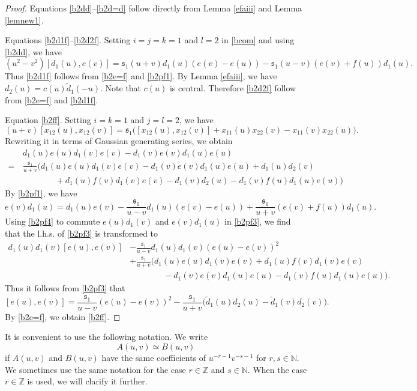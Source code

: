 \documentclass[11pt,reqno]{amsart}
\newcommand{\mybox}{%
    \collectbox{%
        \setlength{\fboxsep}{1pt}%
        \fbox{\BOXCONTENT}%
    }%
}
\numberwithin{equation}{section}
\theoremstyle{definition}
\theoremstyle{remark}
\newcommand{\beq}{\begin{equation}}
\newcommand{\eeq}{\end{equation}}
\newcommand{\bZ}{\mathbb{Z}}
\newcommand{\bN}{\mathbb{N}}
\newcommand{\tl}{\tilde}
\newcommand{\ka}{{\mathfrak s}}
\def \Z{\mathbb{Z}}
\begin{document}
\begin{proof}
Equations \eqref{b2dd}--\eqref{b2d=d} follow directly from Lemma \ref{efaiii} and Lemma \ref{lemnew1}.

\mybox{Equations \eqref{b2d1f}--\eqref{b2d2f}}. Setting $i=j=k=1$ and $l=2$ in \eqref{bcom} and using \eqref{b2dd}, we have
\beq\label{b2pf1}
(u^2-v^2)[d_1(u),e(v)]=\ka_1(u+v)d_1(u)(e(v)-e(u))-\ka_1(u-v)(e(v)+f(u))d_1(u).
\eeq
Thus \eqref{b2d1f} follows from \eqref{b2e=f} and \eqref{b2pf1}. By Lemma \ref{efaiii}, we have $d_2(u)=c(u)\tl d_1(-u)$. Note that $c(u)$ is central. Therefore \eqref{b2d2f} follow from \eqref{b2e=f} and \eqref{b2d1f}.

\mybox{Equation \eqref{b2ff}}. Setting $i=k=1$ and $j=l=2$, we have
\[
(u+v)[x_{12}(u),x_{12}(v)]=\ka_1\big([x_{12}(u),x_{12}(v)]+x_{11}(u)x_{22}(v)-x_{11}(v)x_{22}(u)\big).
\]
Rewriting it in terms of Gaussian generating series, we obtain
\beq\label{b2pf3}
\begin{split}
&\, d_1(u)e(u)d_1(v)e(v)-d_1(v)e(v)d_1(u)e(u)\\
=&\,\frac{\ka_1}{u+v}\Big(d_1(u)e(u)d_1(v)e(v)-d_1(v)e(v)d_1(u)e(u)+d_1(u)d_2(v)\\&\qquad \qquad +d_1(u)f(v)d_1(v)e(v)-d_1(v)d_2(u)-d_1(v)f(u)d_1(u)e(u)\Big)
\end{split}
\eeq
By \eqref{b2pf1}, we have
\beq\label{b2pf4}
e(v)d_1(u)=d_1(u)e(v)-\frac{\ka_1}{u-v}d_1(u)(e(v)-e(u))+\frac{\ka_1}{u+v}(e(v)+f(u))d_1(u).
\eeq
Using \eqref{b2pf4} to commute $e(u)d_1(v)$ and $e(v)d_1(u)$ in \eqref{b2pf3}, we find that the l.h.s. of \eqref{b2pf3} is transformed to
\begin{align*}
d_1(u)d_1(v)[e(u),e(v)]&-\frac{\ka_1}{u-v}d_1(u)d_1(v)(e(u)-e(v))^2\\ &+\frac{\ka_1}{u+v}\Big(d_1(u)e(u)d_1(v)e(v)+d_1(u)f(v)d_1(v)e(v)\\&\qquad\qquad-d_1(v)e(v)d_1(u)e(u)-d_1(v)f(u)d_1(u)e(u)\Big).
\end{align*}
Thus it follows from \eqref{b2pf3} that
\[
[e(u),e(v)]=\frac{\ka_1}{u-v}(e(u)-e(v))^2-\frac{\ka_1}{u+v}\big(\tl d_1(u)d_2(u)-\tl d_1(v)d_2(v)\big).
\]
By \eqref{b2e=f}, we obtain \eqref{b2ff}.
\end{proof}

It is convenient to use the following notation. We write
\[
A(u,v)\simeq B(u,v)
\]
if $A(u,v)$ and $B(u,v)$ have the same coefficients of $u^{-r-1}v^{-s-1}$ for $r,s\in\bN$. We sometimes use the same notation for the case $r\in\Z$ and $s\in\bN$. When the case $r\in\bZ$ is used, we will clarify it further.
\end{document}
